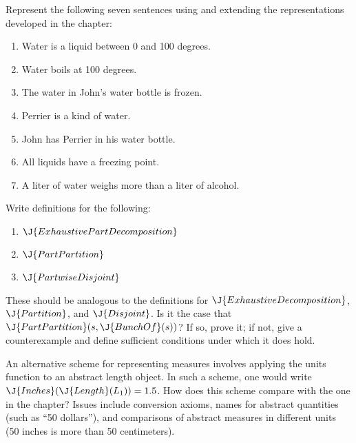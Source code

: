 \begin{exercise}
Represent the following seven sentences using and extending
the representations developed in the chapter:
\begin{enumerate}
\item Water is a liquid between 0 and 100 degrees.
\item Water boils at 100 degrees.
\item The water in John's water bottle is frozen.
\item Perrier is a kind of water.
\item John has Perrier in his water bottle.
\item All liquids have a freezing point.
\item A liter of water weighs more than a liter of alcohol.
\end{enumerate}
\end{exercise} 

\begin{exercise}%
Write definitions for the following:
\begin{enumerate}
\item \(\J{ExhaustivePartDecomposition}\)
\item \(\J{PartPartition}\)
\item \(\J{PartwiseDisjoint}\)
\end{enumerate}
These should be analogous to the definitions for
\(\J{ExhaustiveDecomposition}\), \(\J{Partition}\), and \(\J{Disjoint}\).
Is it the case that \(\J{PartPartition}(s,\J{BunchOf}(s))\)?
If so, prove it; if not, give a counterexample and
define sufficient conditions under which it does hold.
\end{exercise} 

\begin{exercise}
An alternative scheme for representing measures involves applying the
units function to an abstract length object. In such a scheme, one
would write \(\J{Inches}(\J{Length}(L_1)) = {1.5}\). How does this scheme compare
with the one in the chapter? Issues include conversion axioms, names for
abstract quantities (such as ``50 dollars''), and comparisons of
abstract measures in different units (50 inches is more than 50
centimeters).
\end{exercise} 

